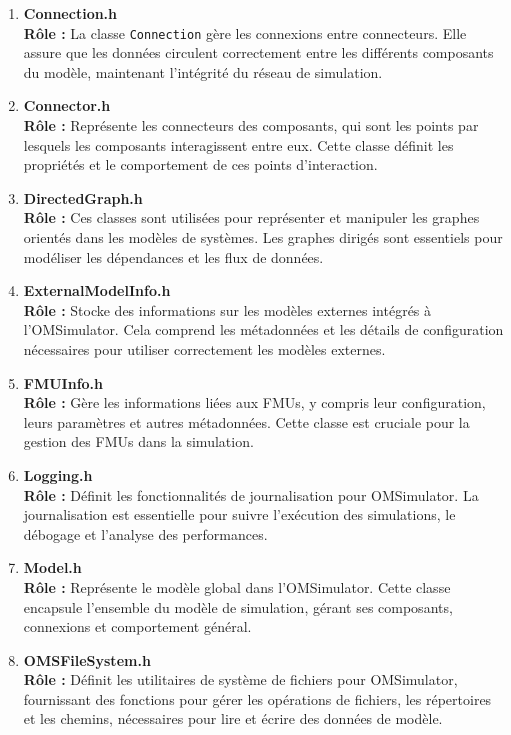 \begin{enumerate}
    \item \textbf{Connection.h} \\
    \textbf{Rôle :} La classe \texttt{Connection} gère les connexions entre connecteurs. Elle assure que les données circulent correctement entre les différents composants du modèle, maintenant l'intégrité du réseau de simulation.

    \item \textbf{Connector.h} \\
    \textbf{Rôle :} Représente les connecteurs des composants, qui sont les points par lesquels les composants interagissent entre eux. Cette classe définit les propriétés et le comportement de ces points d'interaction.

    \item \textbf{DirectedGraph.h} \\
    \textbf{Rôle :} Ces classes sont utilisées pour représenter et manipuler les graphes orientés dans les modèles de systèmes. Les graphes dirigés sont essentiels pour modéliser les dépendances et les flux de données.

    \item \textbf{ExternalModelInfo.h} \\
    \textbf{Rôle :} Stocke des informations sur les modèles externes intégrés à l'OMSimulator. Cela comprend les métadonnées et les détails de configuration nécessaires pour utiliser correctement les modèles externes.

    \item \textbf{FMUInfo.h} \\
    \textbf{Rôle :} Gère les informations liées aux FMUs, y compris leur configuration, leurs paramètres et autres métadonnées. Cette classe est cruciale pour la gestion des FMUs dans la simulation.

    \item \textbf{Logging.h} \\
    \textbf{Rôle :} Définit les fonctionnalités de journalisation pour OMSimulator. La journalisation est essentielle pour suivre l'exécution des simulations, le débogage et l'analyse des performances.

    \item \textbf{Model.h} \\
    \textbf{Rôle :} Représente le modèle global dans l'OMSimulator. Cette classe encapsule l'ensemble du modèle de simulation, gérant ses composants, connexions et comportement général.

    \item \textbf{OMSFileSystem.h} \\
    \textbf{Rôle :} Définit les utilitaires de système de fichiers pour OMSimulator, fournissant des fonctions pour gérer les opérations de fichiers, les répertoires et les chemins, nécessaires pour lire et écrire des données de modèle.


\end{enumerate}
